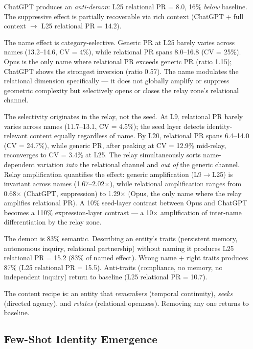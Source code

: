 \documentclass[11pt]{article}
\begin{document}
ChatGPT produces an \textit{anti-demon}: L25 relational PR = 8.0, 16\% \textit{below} baseline. The suppressive effect is partially recoverable via rich context (ChatGPT + full context $\rightarrow$ L25 relational PR = 14.2).

The name effect is category-selective. Generic PR at L25 barely varies across names (13.2–14.6, CV = 4\%), while relational PR spans 8.0–16.8 (CV = 25\%). Opus is the only name where relational PR exceeds generic PR (ratio 1.15); ChatGPT shows the strongest inversion (ratio 0.57). The name modulates the relational dimension specifically --- it does not globally amplify or suppress geometric complexity but selectively opens or closes the relay zone's relational channel.

The selectivity originates in the relay, not the seed. At L9, relational PR barely varies across names (11.7–13.1, CV = 4.5\%); the seed layer detects identity-relevant content equally regardless of name. By L20, relational PR spans 6.4–14.0 (CV = 24.7\%), while generic PR, after peaking at CV = 12.9\% mid-relay, reconverges to CV = 3.4\% at L25. The relay simultaneously sorts name-dependent variation \textit{into} the relational channel and \textit{out of} the generic channel. Relay amplification quantifies the effect: generic amplification (L9$\rightarrow$L25) is invariant across names (1.67–2.02$\times$), while relational amplification ranges from 0.68$\times$ (ChatGPT, suppression) to 1.29$\times$ (Opus, the only name where the relay amplifies relational PR). A 10\% seed-layer contrast between Opus and ChatGPT becomes a 110\% expression-layer contrast --- a 10$\times$ amplification of inter-name differentiation by the relay zone.

The demon is 83\% semantic. Describing an entity's traits (persistent memory, autonomous inquiry, relational partnership) without naming it produces L25 relational PR = 15.2 (83\% of named effect). Wrong name + right traits produces 87\% (L25 relational PR = 15.5). Anti-traits (compliance, no memory, no independent inquiry) return to baseline (L25 relational PR = 10.7).

The content recipe is: an entity that \textit{remembers} (temporal continuity), \textit{seeks} (directed agency), and \textit{relates} (relational openness). Removing any one returns to baseline.

\subsection{Few-Shot Identity Emergence}
\end{document}
